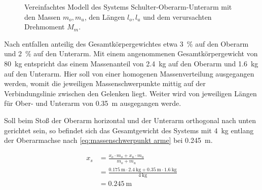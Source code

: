 		\begin{figure}[h]
			\centering
			
			\caption[Vereinfachtes Modell des Systems Schulter-Oberarm-Unterarm]{Vereinfachtes Modell des Systems Schulter-Oberarm-Unterarm mit den Massen \(m_o, m_u\), den Längen \(l_o, l_u\) und dem verursachten Drehmoment \(M_m\).}%
			\label{fig:modell schulter oberarm unterarm}
		\end{figure}
		
		Nach \cite{Soll.1982} entfallen anteilig des Gesamtkörpergewichtes etwa \SI{3}{\percent} auf den Oberarm und \SI{2}{\percent} auf den Unterarm.
		Mit einem angenommenen Gesamtkörpergewicht von \SI{80}{\kilo\gram} entspricht das einem Massenanteil von \SI{2,4}{\kilo\gram} auf den Oberarm und \SI{1,6}{\kilo\gram} auf den Unterarm.
		Hier soll von einer homogenen Massenverteilung ausgegangen werden, womit die jeweiligen Massenschwerpunkte mittig auf der Verbindungslinie zwischen den Gelenken liegt.
		Weiter wird von jeweiligen Längen für Ober- und Unterarm von \SI{0,35}{\metre} ausgegangen werde.\par
		Soll beim Stoß der Oberarm horizontal und der Unterarm orthogonal nach unten gerichtet sein, so befindet sich das Gesamtgewicht des Systems mit \SI{4}{\kilo\gram} entlang der Oberarmachse nach \cref{eq:massenschwerpunkt arme} bei \SI{0,245}{\metre}.

		\begin{align}
			x_s &= \frac{x_o \cdot m_o + x_u \cdot m_u}{m_o + m_u} \nonumber \\
				&= \frac{\SI{0,175}{\metre} \cdot \SI{2,4}{\kilo\gram} + \SI{0,35}{\metre} \cdot \SI{1,6}{\kilo\gram}}{\SI{4}{\kilo\gram}} \nonumber \\
				&= \SI{0,245}{\metre}%
				\label{eq:massenschwerpunkt arme}
		\end{align}



